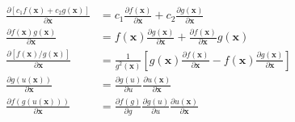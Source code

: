 \documentclass[UTF8,space=auto]{ctexart} %
\begin{document}
\begin{align}
\frac{\partial \left[ c_{1} f(\mathbf{x})+c_{2} g(\mathbf{x}) \right] }{\partial \mathbf{x}} &= c_{1} \frac{\partial f(\mathbf{x})}{\partial \mathbf{x}}+c_{2} \frac{\partial g(\mathbf{x})}{\partial \mathbf{x}} \\
\frac{\partial f(\mathbf{x}) g(\mathbf{x})}{\partial \mathbf{x}} &= f(\mathbf{x}) \frac{\partial g(\mathbf{x})}{\partial \mathbf{x}}+\frac{\partial f(\mathbf{x})}{\partial \mathbf{x}} g(\mathbf{x}) \\
\frac{\partial \left[ f(\mathbf{x}) / g(\mathbf{x}) \right] }{\partial \mathbf{x}} &= \frac{1}{g^{2}(\mathbf{x})}\left[g(\mathbf{x}) \frac{\partial f(\mathbf{x})}{\partial \mathbf{x}}-f(\mathbf{x}) \frac{\partial g(\mathbf{x})}{\partial \mathbf{x}}\right] \\
\frac{\partial g(u(\mathbf{x}))}{\partial \mathbf{x}} &= \frac{\partial g(u)}{\partial u} \frac{\partial u(\mathbf{x})}{\partial \mathbf{x}} \\
\frac{\partial f(g(u(\mathbf{x})))}{\partial \mathbf{x}} &= \frac{\partial f(g)}{\partial g} \frac{\partial g(u)}{\partial u} \frac{\partial u(\mathbf{x})}{\partial \mathbf{x}}
\end{align}
\end{document}
